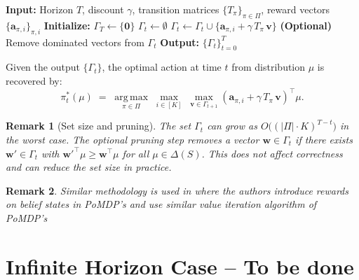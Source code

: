 \documentclass{article}
\newtheorem{remark}{Remark}
\begin{document}
\begin{algorithm}[t]
\caption{Finite-Horizon Value Iteration for Max-Linear Distributional Rewards}
\label{alg:finite-horizon}
\begin{algorithmic}[1]
\STATE \textbf{Input:} Horizon $T$, discount $\gamma$, transition matrices 
       $\{T_\pi\}_{\pi \in \Pi}$, reward vectors $\{\mathbf{a}_{\pi,i}\}_{\pi,i}$
\STATE \textbf{Initialize:} $\Gamma_T \gets \{\mathbf{0}\}$
    \STATE $\Gamma_t \gets \emptyset$
                \STATE $\Gamma_t \gets \Gamma_t \cup 
                       \{\mathbf{a}_{\pi,i} + \gamma\, T_\pi\,\mathbf{v}\}$
            \ENDFOR
        \ENDFOR
    \ENDFOR
    \STATE \textbf{(Optional)} Remove dominated vectors from $\Gamma_t$
\ENDFOR
\STATE \textbf{Output:} $\{\Gamma_t\}_{t=0}^{T}$
\end{algorithmic}
\end{algorithm}

Given the output $\{\Gamma_t\}$, the optimal action at time $t$ from distribution 
$\mu$ is recovered by:
\[
    \pi_t^*(\mu) 
    \;=\; \operatorname*{arg\,max}_{\pi \in \Pi}\;
          \max_{i \in [K]}\;
          \max_{\mathbf{v} \in \Gamma_{t+1}}
          \left(\mathbf{a}_{\pi,i} + \gamma\, T_\pi\,\mathbf{v}\right)^\top\!\mu.
\]

\begin{remark}[Set size and pruning]
The set $\Gamma_t$ can grow as $O\bigl((|\Pi|\cdot K)^{T-t}\bigr)$ in the 
worst case. The optional pruning step removes a vector $\mathbf{w} \in \Gamma_t$ 
if there exists $\mathbf{w}' \in \Gamma_t$ with $\mathbf{w}'^\top\mu \geq 
\mathbf{w}^\top\mu$ for all $\mu \in \Delta(S)$. This does not affect 
correctness and can 
reduce the set size in practice.
\end{remark}


\begin{remark}
    Similar methodology is used in  \cite{NIPS2010_68053af2} where the authors introduce rewards on belief states in PoMDP's and use similar value iteration algorithm of PoMDP's
\end{remark}


\section{Infinite Horizon Case -- To be done  }\label{sec:infinite-horizon}
\end{document}
